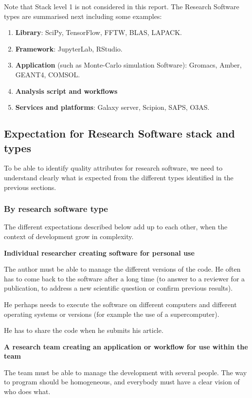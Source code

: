 Note that Stack level 1 is not considered in this report. The Research Software types are summarised next including some examples:

\begin{enumerate}
    \item \textbf{Library}: SciPy, TensorFlow, FFTW, BLAS, LAPACK.
    \item \textbf{Framework}: JupyterLab, RStudio.
    \item \textbf{Application} (such as Monte-Carlo simulation Software): Gromacs, Amber, GEANT4, COMSOL.
    \item \textbf{Analysis script and workflows}
    \item \textbf{Services and platforms}: Galaxy server, Scipion, SAPS, O3AS.
\end{enumerate}


\subsection{Expectation for Research Software stack and types}

To be able to identify quality attributes for research software, we need to understand clearly what is expected from the different types identified in the previous sections.

\subsubsection{By research software type}

The different expectations described below add up to each other, when the context of development grow in complexity.

\textbf{Individual researcher creating software for personal use}

The author must be able to manage the different versions of the code. He often has to come back to the software after a long time (to answer to a reviewer for a publication, to address a new scientific question or confirm previous results).

He perhaps needs to execute the software on different computers and different operating systems or versions (for example the use of a supercomputer).

He has to share the code when he submits his article.

\textbf{A research team creating an application or workflow for use within the team}

The team must be able to manage the development with several people. The way to program should be homogeneous, and everybody must have a clear vision of who does what.

